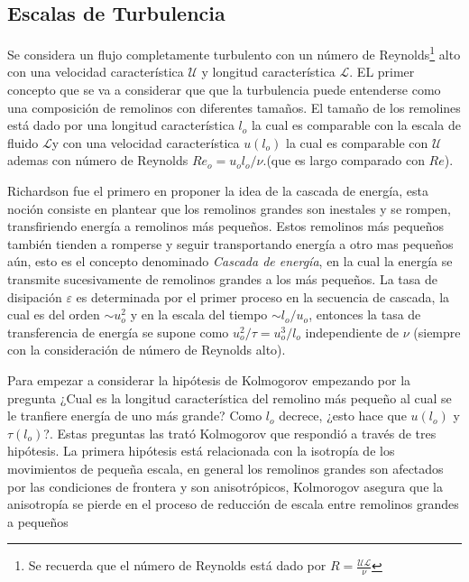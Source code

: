 \subsection{Escalas de Turbulencia }

\noindent Se considera un flujo completamente turbulento con un número de Reynolds\footnote{Se recuerda que el número de Reynolds está dado por $R = \frac{\mathcal{U}\mathcal{L}}{\nu}$} alto con una velocidad característica $\mathcal{U}$ y longitud característica $\mathcal{L}$. EL primer concepto que se va a considerar que que la turbulencia puede entenderse como una composición de remolinos con diferentes tamaños.
El tamaño de los remolines está dado por una longitud característica $l_{o}$ la cual es comparable con la escala de fluido $\mathcal{L}$y con una velocidad característica $u(l_{o})$ la cual es comparable con $\mathcal{U}$ ademas con número de Reynolds $Re_{o} = u_{o}l_{o}/\nu$.(que es largo comparado con $Re$).

\medskip

\noindent Richardson fue el primero en proponer la idea de la cascada de energía, esta noción consiste en plantear que los remolinos grandes son inestales y se rompen, transfiriendo energía a remolinos más pequeños. Estos remolinos más pequeños también tienden a romperse y seguir transportando energía a otro mas pequeños aún, esto es el concepto denominado \emph{Cascada de energía}, en la cual la energía se transmite sucesivamente de remolinos grandes a los más pequeños. La tasa de disipación $\varepsilon$ es determinada por el primer proceso en la secuencia de cascada, la cual es del orden $\sim u_{o}^{2}$ y en la escala del tiempo $\sim l_{o}/u_{o}$, entonces la tasa de transferencia de energía se supone como $u_{o}^{2}/\tau = u_{o}^{3}/l_{o}$ independiente de $\nu$ (siempre con la consideración de número de Reynolds alto).

\medskip

\noindent Para empezar a considerar la hipótesis de Kolmogorov empezando por la pregunta ¿Cual es la longitud característica del remolino más pequeño al cual se le tranfiere energía de uno más grande? Como $l_{o}$ decrece, ¿esto hace que $u(l_{o})$ y $\tau(l_{o})$?. Estas preguntas las trató Kolmogorov que respondió a través de tres hipótesis. La primera hipótesis está relacionada con la isotropía de los movimientos de pequeña escala, en general los remolinos grandes son afectados por las condiciones de frontera y son anisotrópicos, Kolmorogov asegura que la anisotropía se pierde en el proceso de reducción de escala entre remolinos grandes a pequeños

